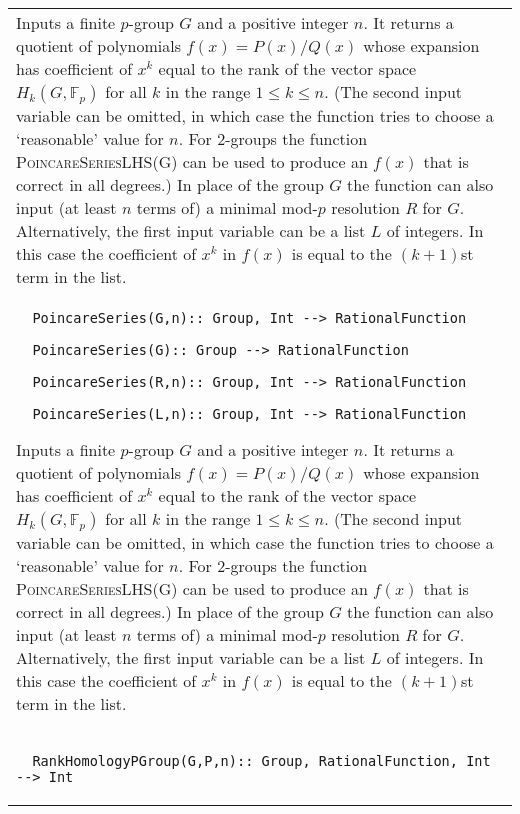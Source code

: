 \documentclass[a4paper,11pt]{report}
\begin{document}
{\begin{center}
\begin{tabular}{|l|}
 Inputs a finite $p$-group $G$ and a positive integer $n$. It returns a quotient of polynomials $f(x)=P(x)/Q(x)$ whose expansion has coefficient of $x^k$ equal to the rank of the vector space $H_k(G,\mathbb F_p)$ for all $k$ in the range $1 \le k \le n$. (The second input variable can be omitted, in which case the function tries
to choose a `reasonable' value for $n$. For 2-groups the function \textsc{PoincareSeriesLHS(G)} can be used to produce an $f(x)$ that is correct in all degrees.) In place of the group $G$ the function can also input (at least $n$ terms of) a minimal mod-$p$ resolution $R$ for $G$. Alternatively, the first input variable can be a list $L$ of integers. In this case the coefficient of $x^k$ in $f(x)$ is equal to the $(k+1)$st term in the list. \\
 \index{PoincareSeries} 
\begin{verbatim}  PoincareSeries(G,n):: Group, Int --> RationalFunction
\end{verbatim}
 
\begin{verbatim}  PoincareSeries(G):: Group --> RationalFunction
\end{verbatim}
 
\begin{verbatim}  PoincareSeries(R,n):: Group, Int --> RationalFunction
\end{verbatim}
 
\begin{verbatim}  PoincareSeries(L,n):: Group, Int --> RationalFunction
\end{verbatim}


 

 Inputs a finite $p$-group $G$ and a positive integer $n$. It returns a quotient of polynomials $f(x)=P(x)/Q(x)$ whose expansion has coefficient of $x^k$ equal to the rank of the vector space $H_k(G,\mathbb F_p)$ for all $k$ in the range $1 \le k \le n$. (The second input variable can be omitted, in which case the function tries
to choose a `reasonable' value for $n$. For 2-groups the function \textsc{PoincareSeriesLHS(G)} can be used to produce an $f(x)$ that is correct in all degrees.) In place of the group $G$ the function can also input (at least $n$ terms of) a minimal mod-$p$ resolution $R$ for $G$. Alternatively, the first input variable can be a list $L$ of integers. In this case the coefficient of $x^k$ in $f(x)$ is equal to the $(k+1)$st term in the list. \\
 \index{RankHomologyPGroup} 
\begin{verbatim}  RankHomologyPGroup(G,P,n):: Group, RationalFunction, Int --> Int
\end{verbatim}



\end{tabular}
\end{center}}
\end{document}
